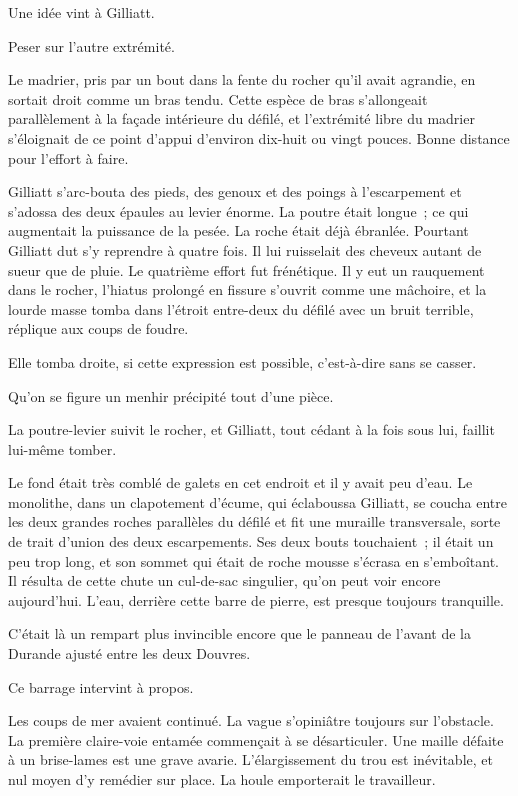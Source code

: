 \documentclass[french,twoside]{book} %
\begin{document}
Une idée vint à Gilliatt.\par
Peser sur l’autre extrémité.\par
Le madrier, pris par un bout dans la fente du rocher qu’il avait agrandie, en sortait droit comme un bras tendu. Cette espèce de bras s’allongeait parallèlement à la façade intérieure du défilé, et l’extrémité libre du madrier s’éloignait de ce point d’appui d’environ dix-huit ou vingt pouces. Bonne distance pour l’effort à faire.\par
Gilliatt s’arc-bouta des pieds, des genoux et des poings à l’escarpement et s’adossa des deux épaules au levier énorme. La poutre était longue ; ce qui augmentait la puissance de la pesée. La roche était déjà ébranlée. Pourtant Gilliatt dut s’y reprendre à quatre fois. Il lui ruisselait des cheveux autant de sueur que de pluie. Le quatrième effort fut frénétique. Il y eut un rauquement dans le rocher, l’hiatus prolongé en fissure s’ouvrit comme une mâchoire, et la lourde masse tomba dans l’étroit entre-deux du défilé avec un bruit terrible, réplique aux coups de foudre.\par
Elle tomba droite, si cette expression est possible, c’est-à-dire sans se casser.\par
Qu’on se figure un menhir précipité tout d’une pièce.\par
La poutre-levier suivit le rocher, et Gilliatt, tout  cédant à la fois sous lui, faillit lui-même tomber.\par
Le fond était très comblé de galets en cet endroit et il y avait peu d’eau. Le monolithe, dans un clapotement d’écume, qui éclaboussa Gilliatt, se coucha entre les deux grandes roches parallèles du défilé et fit une muraille transversale, sorte de trait d’union des deux escarpements. Ses deux bouts touchaient ; il était un peu trop long, et son sommet qui était de roche mousse s’écrasa en s’emboîtant. Il résulta de cette chute un cul-de-sac singulier, qu’on peut voir encore aujourd’hui. L’eau, derrière cette barre de pierre, est presque toujours tranquille.\par
C’était là un rempart plus invincible encore que le panneau de l’avant de la Durande ajusté entre les deux Douvres.\par
Ce barrage intervint à propos.\par
Les coups de mer avaient continué. La vague s’opiniâtre toujours sur l’obstacle. La première claire-voie entamée commençait à se désarticuler. Une maille défaite à un brise-lames est une grave avarie. L’élargissement du trou est inévitable, et nul moyen d’y remédier sur place. La houle emporterait le travailleur.\par
\end{document}
